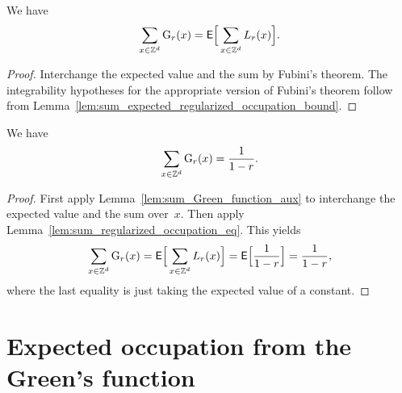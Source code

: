 \begin{lemma}
  \label{lem:sum_Green_function_aux}
  We have
  \begin{align*}
  \sum_{x \in \mathbb{Z}^d} \mathrm{G}_{r}(x) = \mathsf{E} \Big[ \sum_{x \in \mathbb{Z}^d} L_r(x) \Big] .
  \end{align*}
\end{lemma}
\begin{proof}
Interchange the expected value and the sum by Fubini's theorem.
The integrability hypotheses for the appropriate version of Fubini's theorem
follow from Lemma~\ref{lem:sum_expected_regularized_occupation_bound}.
\end{proof}

\begin{lemma}
  \label{lem:sum_Green_function}
  We have
  \begin{align*}
  \sum_{x \in \mathbb{Z}^d} \mathrm{G}_{r}(x) = \frac{1}{1-r} .
  \end{align*}
\end{lemma}
\begin{proof}
First apply Lemma~\ref{lem:sum_Green_function_aux} to interchange the expected value
and the sum over~$x$. Then apply Lemma~\ref{lem:sum_regularized_occupation_eq}.
This yields
\begin{align*}
\sum_{x \in \mathbb{Z}^d} \mathrm{G}_{r}(x) = \mathsf{E} \Big[ \sum_{x \in \mathbb{Z}^d} L_r(x) \Big]
  = \mathsf{E} \Big[ \frac{1}{1-r} \Big] = \frac{1}{1-r} ,
\end{align*}
where the last equality is just taking the expected value of a constant.
\end{proof}



\section{Expected occupation from the Green's function}

